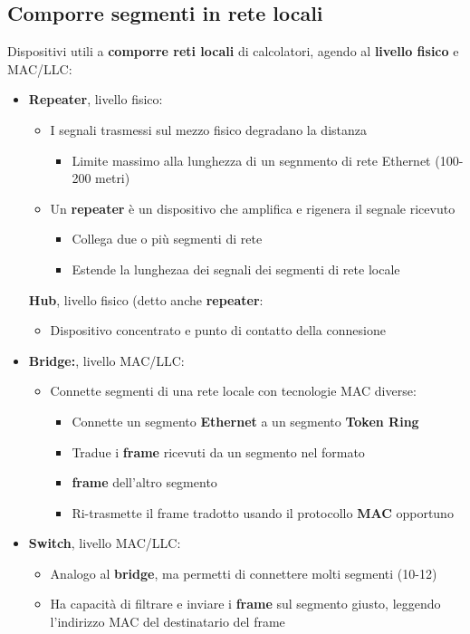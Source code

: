\documentclass{article}
\begin{document}
\subsection{Comporre segmenti in rete locali}
Dispositivi utili a \textbf{comporre reti locali} di calcolatori, agendo al \textbf{livello fisico} e MAC/LLC:
\begin{itemize}
    \item \textbf{Repeater}, livello fisico:
    \begin{itemize}
        \item I segnali trasmessi sul mezzo fisico degradano la distanza
        \begin{itemize}
            \item Limite massimo alla lunghezza di un segnmento di rete Ethernet (100-200 metri)
        \end{itemize}
        \item Un \textbf{repeater} è un dispositivo che amplifica e rigenera il segnale ricevuto
        \begin{itemize}
            \item Collega due o più segmenti di rete
            \item Estende la lunghezaa dei segnali dei segmenti di rete locale
        \end{itemize}
    \end{itemize}
    \textbf{Hub}, livello fisico (detto anche \textbf{repeater}:
    \begin{itemize}
        \item Dispositivo concentrato e punto di contatto della connesione
    \end{itemize}
    \item \textbf{Bridge:}, livello MAC/LLC:
    \begin{itemize}
        \item Connette segmenti di una rete locale con tecnologie MAC diverse:
        \begin{itemize}
            \item Connette un segmento \textbf{Ethernet} a un segmento \textbf{Token Ring}
            \item Tradue i \textbf{frame} ricevuti da un segmento nel formato \item \textbf{frame} dell'altro segmento
            \item Ri-trasmette il frame tradotto usando il protocollo \textbf{MAC} opportuno
         \end{itemize}
    \end{itemize}
    \item \textbf{Switch}, livello MAC/LLC:
    \begin{itemize}
        \item Analogo al \textbf{bridge}, ma permetti di connettere molti segmenti (10-12)
        \item Ha capacità di filtrare e inviare i \textbf{frame} sul segmento giusto, leggendo l'indirizzo MAC del destinatario del frame
    \end{itemize}
\end{itemize}
\end{document}
